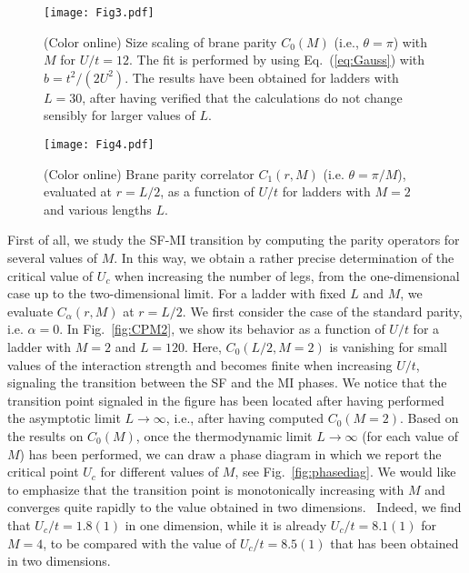 \documentclass[aps,prb,floatfix,twocolumn,amsmath,amssymb]{revtex4}
\begin{document}
\begin{figure}
\texttt{[image: Fig3.pdf]}
\caption{\label{fig:scalingIP}
(Color online) Size scaling of brane parity $C_0(M)$ (i.e., $\theta=\pi$) with $M$ for $U/t=12$. The fit is performed by using 
Eq.~(\ref{eq:Gauss}) with $b=t^2/(2U^2)$. The results have been obtained for ladders with $L=30$, after having verified that the 
calculations do not change sensibly for larger values of $L$.}
\end{figure}

\begin{figure}
\texttt{[image: Fig4.pdf]}
\caption{\label{fig:CFM2}
(Color online) Brane parity correlator $C_{1}(r,M)$ (i.e. $\theta=\pi/M$), evaluated at $r=L/2$, as a function of $U/t$ for ladders 
with $M=2$ and various lengths $L$.}
\end{figure}

First of all, we study the SF-MI transition by computing the parity operators for several values of $M$. In this way, we obtain a 
rather precise determination of the critical value of $U_c$ when increasing the number of legs, from the one-dimensional case up to 
the two-dimensional limit. For a ladder with fixed $L$ and $M$, we evaluate $C_{\alpha}(r,M)$ at $r=L/2$. We first consider the case of 
the standard parity, i.e. $\alpha=0$. In Fig.~\ref{fig:CPM2}, we show its behavior as a function of $U/t$ for a ladder with $M=2$ and 
$L=120$. Here, $C_0(L/2,M=2)$ is vanishing for small values of the interaction strength and becomes finite when increasing $U/t$, 
signaling the transition between the SF and the MI phases. We notice that the transition point signaled in the figure has been located 
after having performed the asymptotic limit $L \to \infty$, i.e., after having computed $C_0(M=2)$. Based on the results on $C_0(M)$, 
once the thermodynamic limit $L \to \infty$ (for each value of $M$) has been performed, we can draw a phase diagram in which we report 
the critical point $U_c$ for different values of $M$, see Fig.~\ref{fig:phasediag}. We would like to emphasize that the transition point 
is monotonically increasing with $M$ and converges quite rapidly to the value obtained in two dimensions.~\cite{Capello2007,Capogrosso2008}
Indeed, we find that $U_c/t=1.8(1)$ in one dimension, while it is already $U_c/t=8.1(1)$ for $M=4$, to be compared with the value of 
$U_c/t=8.5(1)$ that has been obtained in two dimensions.
\end{document}
